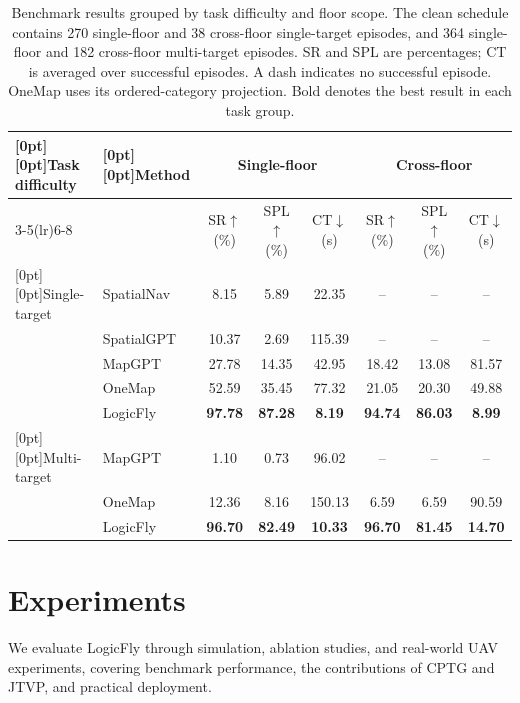 \documentclass[letterpaper,10pt,journal]{IEEEtran}
\begin{document}
\begin{table}[t!]
\caption{Benchmark results grouped by task difficulty and floor scope. The clean schedule contains 270 single-floor and 38 cross-floor single-target episodes, and 364 single-floor and 182 cross-floor multi-target episodes. SR and SPL are percentages; CT is averaged over successful episodes. A dash indicates no successful episode. OneMap uses its ordered-category projection. Bold denotes the best result in each task group.}
\label{tab:main}\centering\small\renewcommand{\arraystretch}{1.15}
\begin{tabular*}{0.94\textwidth}{@{\extracolsep{\fill}}llcccccc@{}}\toprule
\raisebox{-8pt}[0pt][0pt]{Task difficulty}&\raisebox{-8pt}[0pt][0pt]{Method}&\multicolumn{3}{c}{Single-floor}&\multicolumn{3}{c}{Cross-floor}\\
\cmidrule(lr){3-5}\cmidrule(lr){6-8}
&&SR$\uparrow$ (\%)&SPL$\uparrow$ (\%)&CT$\downarrow$ (s)&SR$\uparrow$ (\%)&SPL$\uparrow$ (\%)&CT$\downarrow$ (s)\\\midrule
\raisebox{-22.9pt}[0pt][0pt]{Single-target}&SpatialNav&8.15&5.89&22.35&\multicolumn{1}{c}{--}&\multicolumn{1}{c}{--}&\multicolumn{1}{c}{--}\\
&SpatialGPT&10.37&2.69&115.39&\multicolumn{1}{c}{--}&\multicolumn{1}{c}{--}&\multicolumn{1}{c}{--}\\
&MapGPT&27.78&14.35&42.95&18.42&13.08&81.57\\
&OneMap&52.59&35.45&77.32&21.05&20.30&49.88\\
&LogicFly&\textbf{97.78}&\textbf{87.28}&\textbf{8.19}&\textbf{94.74}&\textbf{86.03}&\textbf{8.99}\\\midrule
\raisebox{-11.45pt}[0pt][0pt]{Multi-target}&MapGPT&1.10&0.73&96.02&\multicolumn{1}{c}{--}&\multicolumn{1}{c}{--}&\multicolumn{1}{c}{--}\\
&OneMap&12.36&8.16&150.13&6.59&6.59&90.59\\
&LogicFly&\textbf{96.70}&\textbf{82.49}&\textbf{10.33}&\textbf{96.70}&\textbf{81.45}&\textbf{14.70}\\\bottomrule
\end{tabular*}
\end{table}

\section{Experiments}
We evaluate LogicFly through simulation, ablation studies, and real-world UAV experiments, covering benchmark performance, the contributions of CPTG and JTVP, and practical deployment.
\end{document}
